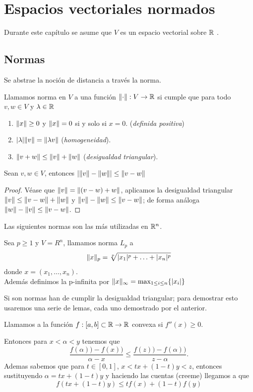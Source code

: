 \chapter{Espacios vectoriales normados}
Durante este capítulo se asume que $V$ es un espacio vectorial sobre $\mathbb{R}$ .
\section{Normas}
Se abstrae la noción de distancia a través la norma.
\begin{definition}\label{def:norma}
  Llamamos norma en $V$ a una función $\lVert\cdot\rVert : V\to \mathbb{R}$ si cumple que para todo $v,w\in V$ y $\lambda \in \mathbb{R}$
  \begin{enumerate}
    \item $\lVert x\rVert\ge 0$ y $\lVert x\rVert=0$ si y solo si $x=0$. (\textit{definida positiva})
    \item $| \lambda|\lVert v\rVert=\lVert\lambda v\rVert$  (\textit{homogeneidad}).
    \item $\lVert v+w\rVert\le \lVert v\rVert+\lVert w\rVert$ (\textit{desigualdad triangular}).
  \end{enumerate}
\end{definition}
\begin{lemma}
  Sean $v,w\in V$, entonces $|\lVert v\rVert-\lVert w\rVert|\le \lVert v-w\rVert$
\end{lemma}
\begin{proof}
  Véase que $\lVert v\rVert=\lVert(v-w)+w\rVert$, aplicamos la desigualdad triangular $\lVert v\rVert\le \lVert v-w\rVert+\lVert w\rVert$ y $\lVert v\rVert-\lVert w\rVert\le \lVert v-w\rVert$; de forma análoga $\lVert w\rVert-\lVert v\rVert\le \lVert v-w\rVert$.
\end{proof}
Las siguientes normas son las más utilizadas en $\mathbb{R}^n$.
\begin{definition}[Normas $L_p$]
  Sea $p\ge 1$ y $V=R^n$, llamamos norma $L_p$ a  
  \[
    \lVert x\rVert_p=\sqrt[p]{\lvert x_1\rvert^p+\ldots+\lvert x_n\rvert^p}
  \] donde $x=(x_1,\ldots,x_n)$.\\
  Además definimos la p-infinita por $\lVert x\rVert_\infty=\max_{1\le i \le n} \{\lvert x_i\rvert\}$ 
\end{definition}
Si son normas han de cumplir la desigualdad triangular; para demostrar esto usaremos una serie de lemas, cada uno demostrado por el anterior.
\begin{definition}
  Llamamos a la función $f:[a,b]\subset \mathbb{R}\to \mathbb{R}$ convexa si $f''(x)\ge 0$.
\end{definition}
Entonces para $x<\alpha<y$ tenemos que \[
    \frac{f(\alpha))-f(x))}{\alpha-x}\le \frac{f(z))-f(\alpha))}{z-\alpha}.
  \] Ademas sabemos que para $t\in[0,1]$, $x<tx+(1-t)y<z$, entonces sustituyendo $\alpha=tx+(1-t)y$ y haciendo las cuentas (creeme) llegamos a que \[
      f(tx+(1-t)y)\le tf(x)+(1-t)f(y)
  \] 
